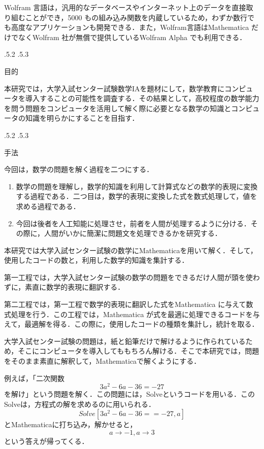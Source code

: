 \documentclass[uplatex,twocolumn]{jsarticle}
\makeatletter
\renewcommand{\section}{%
    \if@slide\clearpage\fi
    \@startsection{section}{1}{\z@}%
    {\Cvs \@plus.5\Cdp \@minus.2\Cdp}%
    {.5\Cvs \@plus.3\Cdp}%
    {\normalfont\raggedright}}
\makeatother
\begin{document}
Wolfram 言語は，汎用的なデータベースやインターネット上のデータを直接取り組むことができ，5000 もの組み込み関数を内蔵しているため，わずか数行でも高度なアプリケーションも開発できる．また，Wolfram言語はMathematica だけでなくWolfram 社が無償で提供しているWolfram Alpha でも利用できる\cite{mitubisi}．



\section{目的}

本研究では，大学入試センター試験数学IAを題材にして，数学教育にコンピュータを導入することの可能性を調査する．その結果として，高校程度の数学能力を問う問題をコンピュータを活用して解く際に必要となる数学の知識とコンピュータの知識を明らかにすることを目指す．





\section{手法}

今回は，数学の問題を解く過程を二つにする．
\begin{enumerate}
\item 数学の問題を理解し，数学的知識を利用して計算式などの数学的表現に変換する過程である．二つ目は，数学的表現に変換した式を数式処理して，値を求める過程である．
\item 今回は後者を人工知能に処理させ，前者を人間が処理するように分ける．その際に，人間がいかに簡潔に問題文を処理できるかを研究する．
\end{enumerate}
 
本研究では大学入試センター試験の数学にMathematicaを用いて解く．そして，使用したコードの数と，利用した数学的知識を集計する．

第一工程では，大学入試センター試験の数学の問題をできるだけ人間が頭を使わずに，素直に数学的表現に翻訳する．

第二工程では，第一工程で数学的表現に翻訳した式をMathematica に与えて数式処理を行う．この工程では，Mathematica が式を最適に処理できるコードを与えて，最適解を得る．この際に，使用したコードの種類を集計し，統計を取る．

大学入試センター試験の問題は，紙と鉛筆だけで解けるように作られているため，そこにコンピュータを導入してももちろん解ける．そこで本研究では，問題をそのまま素直に解釈して，Mathematicaで解くようにする．

例えば，「二次関数\[3a^2 -6a-36=-27\]を解け」という問題を解く．この問題には，Solveというコードを用いる．このSolveは，方程式の解を求めるのに用いられる．\[Solve[3a^2 -6a-36==-27,a]\]とMathematicaに打ち込み，解かせると，\[{{a \rightarrow -1},{a \rightarrow 3}}\]という答えが帰ってくる．
\end{document}
